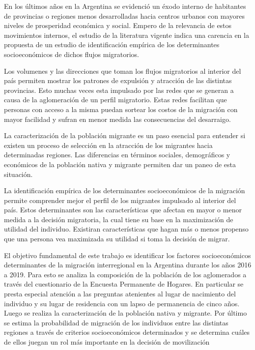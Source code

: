 \documentclass[12pt,a4paper]{article}
\begin{document}
En los últimos años en la Argentina se evidenció un éxodo interno de habitantes de provincias o regiones menos desarrolladas hacia centros urbanos con mayores niveles de prosperidad económica y social. Empero de la relevancia de estos movimientos internos, el estudio de la literatura vigente indica una carencia en la propuesta de un estudio de identificación empírica de los determinantes socioeconómicos de dichos flujos migratorios.

Los volumenes y las direcciones que toman los flujos migratorios al interior del país permiten mostrar los patrones de expulsión y atracción de las distintas provincias. Esto muchas veces esta impulsado por las redes que se generan a causa de la aglomeración de un perfil migratorio. Estas redes facilitan que personas con acceso a la misma puedan sortear los costos de la migración con mayor facilidad y sufran en menor medida las consecuencias del desarraigo.

La caracterización de la población migrante es un paso esencial para entender si existen un proceso de selección en la atracción de los migrantes hacia determinadas regiones. Las diferencias en términos sociales, demográficos y económicos de la población nativa y migrante permiten dar un paneo de esta situación.

La identificación empírica de los determinantes socioeconómicos de la migración permite comprender mejor el perfil de los migrantes impulsado al interior del país. Estos determinantes son las características que afectan en mayor o menor medida a la decisión migratoria, la cual tiene su base en la maximización de utilidad del individuo. Existiran características que hagan más o menos propenso que una persona vea maximizada su utilidad si toma la decisión de migrar.

El objetivo fundamental de este trabajo es identificar los factores socioeconómicos determinantes de la migración interregional en la Argentina durante los años 2016 a 2019. Para esto se analiza la composición de la población de los aglomerados a través del cuestionario de la Encuesta Permanente de Hogares. En particular se presta especial atención a las preguntas atenientes al lugar de nacimiento del individuo y su lugar de residencia con un lapso de permanencia de cinco años. Luego se realiza la caracterización de la población nativa y migrante. Por último se estima la probabilidad de migración de los individuos entre las distintas regiones a través de criterios socioeconómicos determinados y se determina cuáles de ellos juegan un rol más importante en la decisión de movilización
\end{document}
